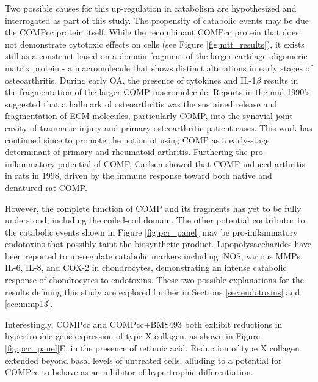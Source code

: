 \begin{refsection}
\label{sec:comp_catabolism}
Two possible causes for this up-regulation in catabolism are hypothesized and
interrogated as part of this study. The propensity of catabolic events may be
due the COMPcc protein itself. While the recombinant COMPcc protein that
does not demonstrate cytotoxic effects on cells (see Figure
\ref{fig:mtt_results}), it exists still as a construct based on a domain
fragment of the larger cartilage oligomeric matrix protein - a macromolecule
that shows distinct alterations in early stages of osteoarthritis. During early
OA, the presence of cytokines and IL-1${\beta}$ results in the fragmentation of
the larger COMP macromolecule.\cite{Heinegard2011} Reports in the mid-1990's
suggested that a hallmark of osteoarthritis was the sustained release and
fragmentation of ECM molecules, particularly COMP, into the synovial joint
cavity of traumatic injury and primary osteoarthritic patient
cases.\cite{Lohmander1994,DiCesare2002,Pichika2004} This work has continued
since to promote the notion of using COMP as a early-stage determinant of
primary and rheumatoid arthritis.\cite{Vilim1997,Vilim2002,Heinegard2011}
Furthering the pro-inflammatory potential of COMP, Carlsen showed that COMP
induced arthritis in rats in 1998, driven by the immune response toward both
native and denatured rat COMP.\cite{Carlsen1998}

However, the complete function of COMP and its fragments has yet to be fully
understood, including the coiled-coil domain. The other potential contributor to
the catabolic events shown in Figure \ref{fig:pcr_panel} may be pro-inflammatory
endotoxins that possibly taint the biosynthetic product. Lipopolysaccharides
have been reported to up-regulate catabolic markers including iNOS, various
MMPs, IL-6, IL-8, and COX-2 in chondrocytes, demonstrating an intense
catabolic response of chondrocytes to
endotoxins.\cite{Lotz1992,Geng1995,Malemud2013,Guerne1990,Murrell1995} These two
possible explanations for the results defining this study are explored further
in Sections \ref{sec:endotoxins} and \ref{sec:mmp13}.


Interestingly, COMPcc and COMPcc+BMS493 both exhibit reductions
in hypertrophic gene expression of type X collagen, as shown in Figure
\ref{fig:pcr_panel}E, in the presence of retinoic acid. Reduction of type X
collagen extended beyond basal levels of untreated cells, alluding to a
potential for COMPcc to behave as an inhibitor of hypertrophic differentiation.


\end{refsection}
